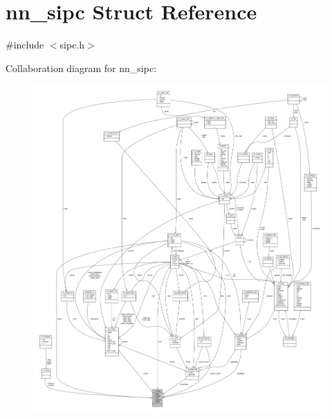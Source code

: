 \hypertarget{structnn__sipc}{}\section{nn\+\_\+sipc Struct Reference}
\label{structnn__sipc}


{\ttfamily \#include $<$sipc.\+h$>$}



Collaboration diagram for nn\+\_\+sipc\+:\nopagebreak
\begin{figure}[H]
\begin{center}
\leavevmode
\includegraphics[width=350pt]{structnn__sipc__coll__graph}
\end{center}
\end{figure}
